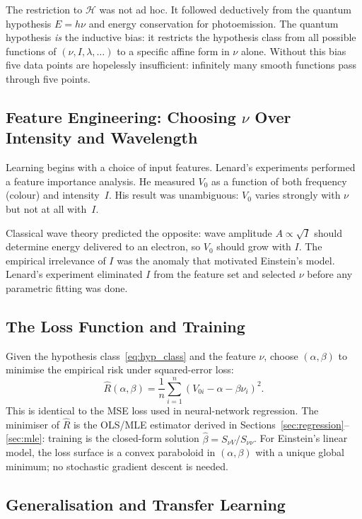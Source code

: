 \documentclass[12pt]{article}
\begin{document}
The restriction to $\mathcal{H}$ was not ad hoc.  It followed deductively
from the quantum hypothesis $E=h\nu$ and energy conservation for photoemission.
The quantum hypothesis \emph{is} the inductive bias: it restricts the
hypothesis class from all possible functions of $(\nu, I, \lambda, \ldots)$
to a specific affine form in $\nu$ alone.  Without this bias five data points
are hopelessly insufficient: infinitely many smooth functions pass through
five points.

\subsection{Feature Engineering: Choosing $\nu$ Over Intensity
and Wavelength}

Learning begins with a choice of input features.
Lenard's experiments performed a feature importance analysis.  He
measured $V_0$ as a function of both frequency (colour) and intensity~$I$.  His
result was unambiguous: $V_0$ varies strongly with $\nu$ but not at all with~$I$.

Classical wave theory predicted the opposite: wave amplitude $A \propto
\sqrt{I}$ should determine energy delivered to an electron, so $V_0$ should
grow with $I$.  The empirical irrelevance of $I$ was the anomaly that
motivated Einstein's model.  Lenard's experiment eliminated $I$ from the
feature set and selected $\nu$ before any parametric fitting was done.

\subsection{The Loss Function and Training}

Given the hypothesis class~\eqref{eq:hyp_class} and the feature $\nu$, choose
$(\alpha,\beta)$ to minimise the empirical risk under squared-error loss:
\[
  \hat{R}(\alpha,\beta) = \frac{1}{n}\sum_{i=1}^n(V_{0i} - \alpha - \beta\nu_i)^2.
\]
This is identical to the MSE loss used in neural-network regression.  The
minimiser of $\hat{R}$ is the OLS/MLE estimator derived in
Sections~\ref{sec:regression}--\ref{sec:mle}: training is the closed-form
solution $\hat\beta = S_{\nu V}/S_{\nu\nu}$.  For Einstein's linear model,
the loss surface is a convex paraboloid in $(\alpha,\beta)$ with a unique
global minimum; no stochastic gradient descent is needed.

\subsection{Generalisation and Transfer Learning}
\end{document}
